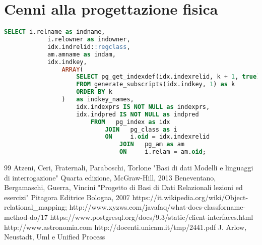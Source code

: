 \documentclass[12pt,a4paper,onecolumn,x11names]{article}
\begin{document}
%

\newpage

\section{Cenni alla progettazione fisica}

	\begin{lstlisting}[language=SQL, caption=Cerca indici]
		SELECT i.relname as indname,
			i.relowner as indowner,
			idx.indrelid::regclass,
			am.amname as indam,
			idx.indkey,
				ARRAY(
					SELECT pg_get_indexdef(idx.indexrelid, k + 1, true)
					FROM generate_subscripts(idx.indkey, 1) as k
					ORDER BY k
				) 	as indkey_names,
					idx.indexprs IS NOT NULL as indexprs,
					idx.indpred IS NOT NULL as indpred
						FROM   pg_index as idx
							JOIN   pg_class as i
							ON     i.oid = idx.indexrelid
								JOIN   pg_am as am
								ON     i.relam = am.oid;
	\end{lstlisting}

\newpage

\renewcommand\refname{Bibliografia}
\begin{thebibliography} {99}
	 Atzeni, Ceri, Fraternali, Paraboschi, Torlone
	"Basi di dati Modelli e linguaggi di interrogazione"
	Quarta edizione, McGraw-Hill, 2013
	 Beneventano, Bergamaschi, Guerra, Vincini "Progetto di Basi di Dati Relazionali lezioni ed esercizi"
	Pitagora Editrice Bologna, 2007
	 https://it.wikipedia.org/wiki/Object-relational\_mapping;
	 http://www.xyzws.com/javafaq/what-does-classforname-method-do/17
	 https://www.postgresql.org/docs/9.3/static/client-interfaces.html
	http://www.astronomia.com
	http://docenti.unicam.it/tmp/2441.pdf
	 J. Arlow, Neustadt, Uml e Unified Process
\end{thebibliography}
\end{document}

